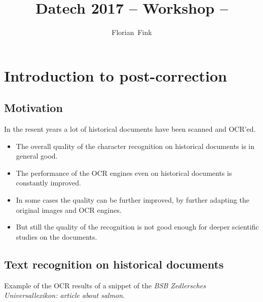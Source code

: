 
\title{Datech 2017 -- \pocoto{} Workshop -- \pocoto{}}
\author{Florian~Fink}



\begin{frame}
	\titlepage
\end{frame}

\section{Introduction to post-correction}
\subsection{Motivation}
\begin{frame}
	In the resent years a lot of historical documents have been
	scanned and OCR'ed.

	\begin{itemize}
		\item The overall quality of the character recognition on historical
			documents is in general good.
		\item The performance of the OCR engines even on historical documents is
			constantly improved.
		\item In some cases the quality can be further improved, by further
			adapting the original images and OCR engines.
		\item But still the quality of the recognition is not good enough for
			deeper scientific studies on the documents.
	\end{itemize}
\end{frame}


\subsection{Text recognition on historical documents}
\begin{frame}
	Example of the OCR results of a snippet of the \emph{BSB Zedlersches
	Universallexikon: article about salmon.}
\end{frame}


